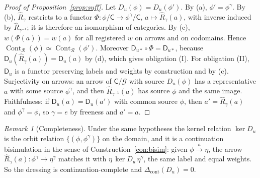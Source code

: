 \documentclass[11pt]{article}
\theoremstyle{plain}
\theoremstyle{definition}
\theoremstyle{remark}
\newtheorem{remark}{Remark}
\newcommand{\G}{\mathcal G}
\newcommand{\R}{\mathcal R}
\newcommand{\Cont}{\operatorname{Cont}}
\begin{document}
\begin{proof}[Proof of Proposition~\ref{prop:suff}]
Let $D_u(\phi)=D_u(\phi')$. By (a), $\phi'=\phi^\gamma$. By (b), $\widehat R_\gamma$ restricts to a functor $\Phi:\phi/\mathsf C\to\phi^\gamma/\mathsf C$, $a\mapsto\widehat R_\gamma(a)$, with inverse induced by $\widehat R_{\gamma^{-1}}$; it is therefore an isomorphism of categories. By (c), $w(\Phi(a))=w(a)$ for all registered $w$ on arrows and on codomains. Hence $\Cont_\R(\phi)\simeq\Cont_\R(\phi')$. Moreover $\mathsf D_{u*}\circ\Phi=\mathsf D_{u*}$, because $\mathsf D_u(\widehat R_\gamma(a))=\mathsf D_u(a)$ by (d), which gives obligation (I). For obligation (II), $\mathsf D_u$ is a functor preserving labels and weights by construction and by (c). Surjectivity on arrows: an arrow of $\mathsf C/\G$ with source $D_u(\phi)$ has a representative $a$ with some source $\phi^\gamma$, and then $\widehat R_{\gamma^{-1}}(a)$ has source $\phi$ and the same image. Faithfulness: if $\mathsf D_u(a)=\mathsf D_u(a')$ with common source $\phi$, then $a'=\widehat R_\gamma(a)$ and $\phi^\gamma=\phi$, so $\gamma=e$ by freeness and $a'=a$.
\end{proof}

\begin{remark}[Completeness]
Under the same hypotheses the kernel relation $\ker D_u$ is the orbit relation $\{(\phi,\phi^\gamma)\}$ on the domain, and it is a continuation bisimulation in the sense of Construction~\ref{con:bisim}: given $\phi\xrightarrow{a}\eta$, the arrow $\widehat R_\gamma(a):\phi^\gamma\to\eta^\gamma$ matches it with $\eta\,\ker D_u\,\eta^\gamma$, the same label and equal weights. So the dressing is continuation-complete and $\Delta_{\mathrm{cont}}(D_u)=0$.
\end{remark}
\end{document}
